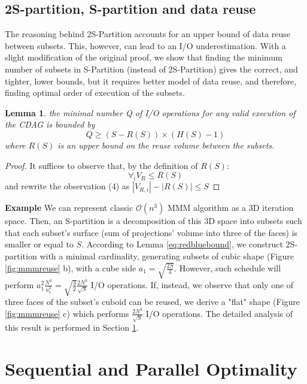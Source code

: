 \documentclass[sigplan,review,anonymous]{acmart}\settopmatter{printfolios=true,printccs=false,printacmref=false}
\newtheorem{lma}{Lemma}
\newcommand{\macb}[1]{\textbf{\textsf{#1}}}
\begin{document}
\subsection{2S-partition, S-partition and data reuse}


The reasoning behind 2S-Partition accounts for an upper bound of data reuse
between subsets.  This, however, can lead to an I/O underestimation. With a
slight modification of the original proof, we show that finding the minimum
number of subsets in S-Partition (instead of 2S-Partition) gives the correct,
and tighter, lower bounds, but it requires better model of data reuse, and
therefore, finding optimal order of execution of the subsets.

\begin{lma}
	the minimal number Q of I/O operations for any valid execution of the CDAG 
	is
	bounded by	
	\begin{equation}
	Q \ge (S - R(S)) \times (H(S) - 1)
	\label{eq:reusebound} \end{equation}
	where $R(S)$ is an upper bound on the reuse volume between the subsets.
\end{lma}

\begin{proof}
	It suffices to observe that, by the definition of $R(S)$:
	$$\forall_{i} V_{R} \le R(S)$$
	and rewrite the observation (4) as $|V_{R,i}| - |R(S)| \le S$ 
\end{proof}

\noindent
\macb{Example}
%
We can represent classic $\mathcal{O}(n^3)$ MMM algorithm as a 3D iteration space. Then, 
an S-partition is a decomposition of this 3D space into subsets such that each 
subset's surface (sum of projections' volume into three of the faces) is 
smaller or equal to $S$. According to Lemma \ref{eq:redbluebound}, we construct 
2S-partition with a minimal cardinality, generating subsets of cubic shape 
(Figure \ref{fig:mmmreuse} b), with a cube side $a_1 = \sqrt{\frac{2S}{3}}$. 
However, such schedule will perform $a_1^2 \frac{N^3}{a_1^3} = 
\sqrt{\frac{3}{2}}\frac{2N^3}{\sqrt{S}}$ I/O operations. If, instead, we 
observe that only one of three faces of the subset's cuboid can be reused, we 
derive a "flat" shape (Figure \ref{fig:mmmreuse} c) which performs 
$\frac{2N^3}{\sqrt{S}}$ I/O operations. The detailed analysis of this result is 
performed in Section \ref{sec:datareuse}.



\section{Sequential and Parallel Optimality}
\label{sec:datareuse}
\end{document}
